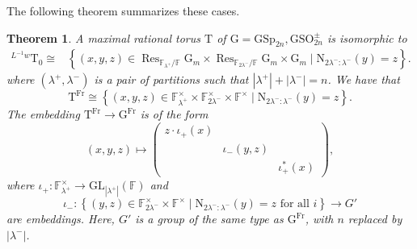 \documentclass[12pt, reqno]{amsart}
\newtheorem{theorem}{Theorem}[section]
\theoremstyle{definition}
\theoremstyle{definition}
\theoremstyle{definition}
\newcommand{\multiplicativegroup}[1]{#1^{\times}}
\newcommand{\sizeof}[1]{\left|#1\right|}
\newcommand{\GL}{\mathrm{GL}}
\newcommand{\GSO}{\mathrm{GSO}}
\newcommand{\GSp}{\mathrm{GSp}}
\newcommand{\FieldNorm}[2]{\mathrm{N}_{#1:#2}}
\newcommand{\finiteField}{\mathbb{F}}
\newcommand{\finiteFieldExtension}[1]{\finiteField_{#1}}
\newcommand{\Frobenius}{\operatorname{Fr}}
\newcommand{\restrictionOfScalars}[3]{\operatorname{Res}_{#1 \slash #2}{#3}}
\newcommand{\multiplcativeScheme}{\algebraicGroup{G}_m}
\newcommand{\algebraicGroup}[1]{\boldsymbol{\mathrm{#1}}}
\begin{document}
	The following theorem summarizes these cases.
	\begin{theorem}
	A maximal rational torus $\algebraicGroup{T}$ of $\algebraicGroup{G} =  \algebraicGroup{\GSp}_{2n}, \algebraicGroup{\GSO}_{2n}^{\pm}$ is isomorphic to \begin{align*}
				^{L^{-1}w}\algebraicGroup{T}_0 \cong& \left\{\left(x,y,z\right) \in  \restrictionOfScalars{\finiteFieldExtension{\lambda^+}}{\finiteField}{\multiplcativeScheme} \times \restrictionOfScalars{\finiteFieldExtension{2\lambda^-}}{\finiteField}{\multiplcativeScheme}  \times \multiplcativeScheme \mid \FieldNorm{2\lambda^-}{\lambda^-}(y) = z \right\}.
	\end{align*}
	where $\left(\lambda^+, \lambda^-\right)$ is a pair of partitions such that $\sizeof{\lambda^+} + \sizeof{\lambda^-} = n$. We have that $$\algebraicGroup{T}^{\Frobenius} \cong \left\{\left(x, y, z\right) \in \multiplicativegroup{\finiteFieldExtension{\lambda^+}} \times \multiplicativegroup{\finiteFieldExtension{2 \lambda^-}} \times \multiplicativegroup{\finiteField} \mid \FieldNorm{2 \lambda^{-}}{\lambda^{-}}\left(y\right) = z \right\}.$$ The embedding $\algebraicGroup{T}^{\Frobenius} \to \algebraicGroup{G}^{\Frobenius}$ is of the form $$\left(x, y, z\right) \mapsto
	\begin{pmatrix}
		z \cdot \iota_+ \left(x\right)\\
		& \iota_{-}\left(y,z\right) &\\
		& & \iota_+^{\ast}\left(x\right)
	\end{pmatrix},$$
	where $\iota_+ \colon \multiplicativegroup{\finiteFieldExtension{\lambda^+}} \to \GL_{\sizeof{\lambda^+}}\left(\finiteField\right)$ and $$\iota_- \colon \left\{ \left(y, z\right)\in \multiplicativegroup{\finiteFieldExtension{2 \lambda^-}} \times \multiplicativegroup{\finiteField} \mid \FieldNorm{2 \lambda^{-}}{\lambda^{-}}\left(y\right) = z \text{ for all } i \right\} \to G'$$ are embeddings. Here, $G'$ is a group of the same type as $\algebraicGroup{G}^{\Frobenius}$, with $n$ replaced by $\sizeof{\lambda^{-}}$.
\end{theorem}
\end{document}
